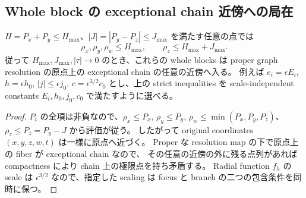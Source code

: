 \subsection{Whole block の exceptional chain 近傍への局在}

\begin{lemma}
$H=P_x+P_y\le H_{\max}$、$|J|=|P_y-P_z|\le J_{\max}$ を満たす任意の点では
\[
 \rho_x,\rho_y,\rho_w\le H_{\max},\qquad
 \rho_z\le H_{\max}+J_{\max}.
\]
従って $H_{\max},J_{\max},|\tau|\to0$ のとき、これらの whole blocks は
proper graph resolution の原点上の exceptional chain の任意の近傍へ入る。
例えば $e_i=\epsilon E_i$, $h=\epsilon h_0$,
$|j|\le\epsilon j_0$, $c=\epsilon^{3/2}c_0$ とし、上の strict inequalities を
scale-independent constants $E_i,h_0,j_0,c_0$ で満たすように選べる。
\end{lemma}

\begin{proof}
$P_i$ の全項は非負なので、$\rho_x\le P_x$, $\rho_y\le P_y$,
$\rho_w\le\min(P_x,P_y,P_z)$、$\rho_z\le P_z=P_y-J$ から評価が従う。
したがって original coordinates $(x,y,z,w,t)$ は一様に原点へ近づく。
Proper な resolution map の下で原点上の fiber が exceptional chain なので、
その任意の近傍の外に残る点列があれば compactness により chain 上の極限点を持ち矛盾する。
Radial function $f_h$ の scale は $\epsilon^{3/2}$ なので、指定した scaling は
focus と branch の二つの包含条件を同時に保つ。
\end{proof}
